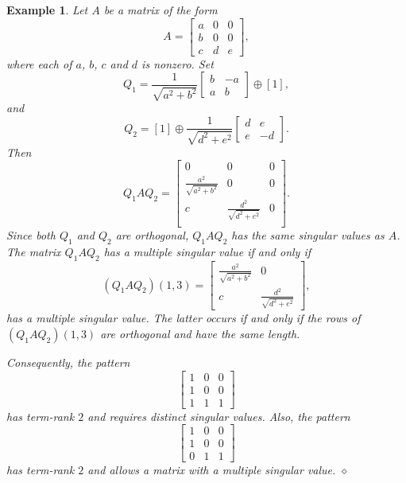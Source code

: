 \documentclass[preprint,12pt]{elsarticle}
\newtheorem{Example}[theorem]{Example}
\begin{document}
\begin{Example}\rm
    Let $A$ be a matrix of the form
    \[ A = 
    \left\lbrack
    \begin{array}{c|cc}
         a & 0 & 0  \\
         b & 0 & 0\\
         \hline
         c & d & e
    \end{array}
    \right\rbrack,
    \]
    where each of $a$, $b$, $c$ and $d$ is nonzero.
 Set
    \[ Q_1 =  
    \frac{1}{\sqrt{a^2+b^2}}\left\lbrack
    \begin{array}{rr}
         b& -a\\
         a & b
    \end{array} 
    \right\rbrack\oplus [1],
    \]
    and
    \[ Q_2 =  
    [1] \oplus \frac{1}{\sqrt{d^2+e^2}}\left\lbrack
    \begin{array}{rr}
       d & e\\
       e & -d
    \end{array}
    \right\rbrack.
    \] 
Then 
    \[
    Q_1AQ_2 = \left\lbrack
\begin{array}{ccc}
     0 & 0 & 0   \\
     \frac{a^2}{\sqrt{a^2+b^2}} & 0 & 0   \\
     c & \frac{d^2}{\sqrt{d^2+e^2}} & 0   \\
\end{array}
    \right\rbrack.
    \]
Since both $Q_1$ and $Q_2$ are orthogonal, $Q_1AQ_2$ has the same singular values as $A$. The matrix $Q_1AQ_2$  has a multiple singular value if and only if
\[
(Q_1AQ_2)(1,3)= \left\lbrack
\begin{array}{rr}
  \frac{a^2}{\sqrt{a^2+b^2}} & 0    \\
     c & \frac{d^2}{\sqrt{d^2+e^2}} 
\end{array}
\right\rbrack,
\]
has a multiple singular value. The latter occurs  if and only if  the rows of $(Q_1AQ_2)(1,3)$ are orthogonal 
and have the same length.

Consequently, the pattern 
\[ 
\begin{bmatrix}
    1 & 0 & 0 \\
    1 & 0 & 0 \\
    1 & 1 & 1 
\end{bmatrix}
\]
has term-rank $2$ and requires distinct singular values. 
Also, the pattern 
\[ 
\begin{bmatrix}
    1 & 0 & 0 \\
    1 & 0 & 0 \\
    0 & 1 & 1 
\end{bmatrix}
\]
has term-rank $2$ and allows a matrix with a multiple singular value. $\diamond$
\end{Example}
\end{document}
